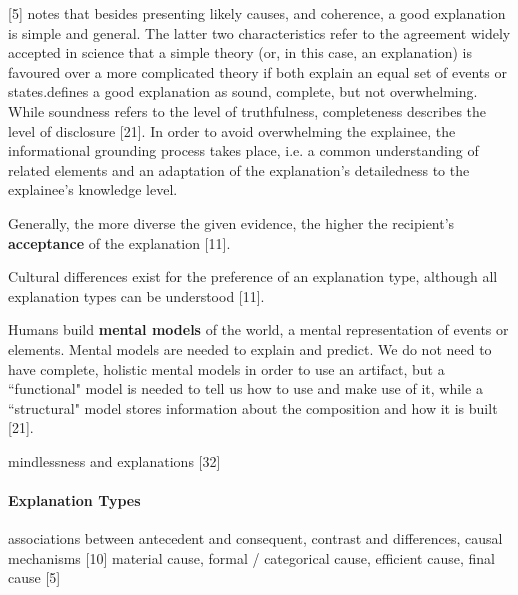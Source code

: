 [5] notes that besides presenting likely causes, and coherence, a good explanation is simple and general. The latter two characteristics refer to the agreement widely accepted in science that a simple theory (or, in this case, an explanation) is favoured over a more complicated theory if both explain an equal set of events or states.\newline
[21] defines a good explanation as sound, complete, but not overwhelming. While soundness refers to the level of truthfulness, completeness describes the level of disclosure [21]. In order to avoid overwhelming the explainee, the informational grounding process takes place, i.e. a common understanding of related elements and an adaptation of the explanation's detailedness to the explainee's knowledge level.\newline

Generally, the more diverse the given evidence, the higher the recipient's \textbf{acceptance} of the explanation [11].\newline

Cultural differences exist for the preference of an explanation type, although all explanation types can be understood [11].\newline

Humans build \textbf{mental models} of the world, a mental representation of events or elements. Mental models are needed to explain and predict. We do not need to have complete, holistic mental models in order to use an artifact, but a ``functional" model is needed to tell us how to use and make use of it, while a ``structural" model stores information about the composition and how it is built [21]. \newline

mindlessness and explanations [32]\newline

\paragraph{Explanation Types}
associations between antecedent and consequent, contrast and differences, causal mechanisms [10] \newline
material cause, formal / categorical cause, efficient cause, final cause [5] \newline


